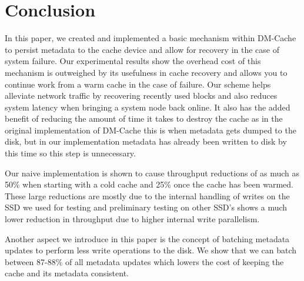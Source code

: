 \section{Conclusion}
\label{sec:conclusion}

In this paper, we created and implemented a basic mechanism within
DM-Cache to persist metadata to the cache device and allow for
recovery in the case of system failure. Our experimental results show
the overhead cost of this mechanism is outweighed by its usefulness in
cache recovery and allows you to continue work from a warm cache in
the case of failure. Our scheme helps alleviate network traffic by
recovering recently used blocks and also reduces system latency when
bringing a system node back online. It also has the added benefit of
reducing the amount of time it takes to destroy the cache as in the
original implementation of DM-Cache this is when metadata gets dumped
to the disk, but in our implementation metadata has already been
written to disk by this time so this step is unnecessary.

Our naive implementation is shown to cause throughput reductions of as
much as 50\% when starting with a cold cache and 25\% once the cache
has been warmed. These large reductions are mostly due to the internal
handling of writes on the SSD we used for testing and preliminary
testing on other SSD's shows a much lower reduction in throughput due
to higher internal write parallelism.

Another aspect we introduce in this paper is the concept of batching
metadata updates to perform less write operations to the disk. We show
that we can batch between 87-88\% of all metadata updates which lowers
the cost of keeping the cache and its metadata consistent.
